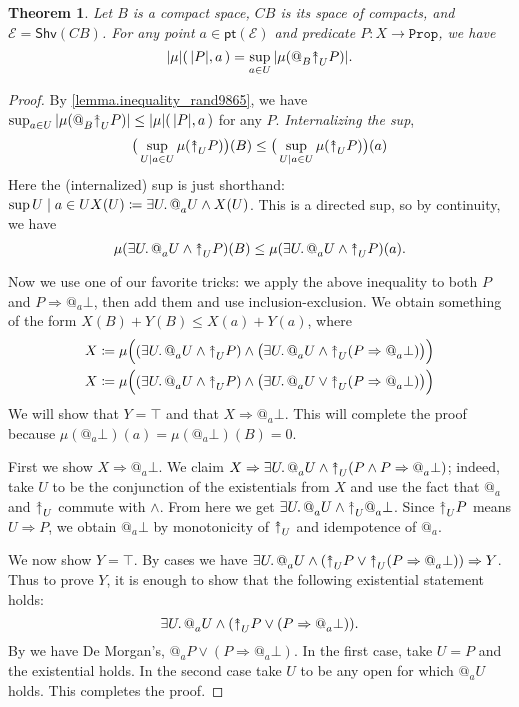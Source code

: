 \documentclass[11pt, oneside, article]{memoir}
\makeatletter
\theoremstyle{plain}
\newtheorem{theorem}{Theorem}[chapter] %
\theoremstyle{definition}
\theoremstyle{remark}
\newcommand{\const}[1]{\mathtt{#1}}
\newcommand{\cat}[1]{\mathcal{#1}}
\newcommand{\Fun}[1]{\mathsf{#1}}
\newcommand{\Shv}{\Fun{Shv}}
\newcommand{\Prop}{\const{Prop}}
\newcommand{\pt}{\Fun{pt}}
\newcommand{\AtSymbol}{{@}}
\newcommand{\InSymbol}{{\upclose}}%
\newcommand{\At}[2][]{\AtSymbol^{#1}_{#2}}
\newcommand{\In}[2][]{\InSymbol^{#1}_{#2}}
\newcommand{\upclose}{{\rotatebox[origin=c]{90}{$\twoheadrightarrow$}}}
\newcommand{\imp}{\Rightarrow}
\makeatother
\begin{document}
\begin{theorem}
Let $B$ is a compact space, $CB$ is its space of compacts, and $\cat{E}=\Shv(CB)$. For any point $a\in\pt(\cat{E})$ and predicate $P:X\to\Prop$, we have
\[
|\mu|(\,|P|,a\,)=\sup_{a\in U}|\mu(\At{B}\In{U}P)|.
\]
\end{theorem}
\begin{proof}
By \cref{lemma.inequality_rand9865}, we have $\sup_{a\in U}|\mu(\At{B}\In{U}P)|\leq |\mu|(\,|P|,a\,)$ for any $P$. \emph{Internalizing the sup}, 
\[\big(\sup_{U\mid a\in U}\mu(\In{U}P)\big)(B)\leq\big(\sup_{U\mid a\in U}\mu(\In{U}P)\big)(a)\]
Here the (internalized) sup is just shorthand: $\sup{U\mid a\in U}X(U)\coloneqq \exists U\ldotp \At{a}U\wedge X(U)$. This is a directed sup, so by continuity, we have
\[\mu(\exists U\ldotp \At{a}U\wedge\In{U}P)(B)\leq\mu(\exists U\ldotp \At{a}U\wedge\In{U}P)(a).\]

Now we use one of our favorite tricks: we apply the above inequality to both $P$ and $P\imp\At{a}\bot$, then add them and use inclusion-exclusion.
We obtain something of the form $X(B)+Y(B)\leq X(a)+Y(a)$, where
\begin{align*}
	X\coloneqq\mu\Big((\exists U\ldotp \At{a}U\wedge\In{U}P)\wedge\big(\exists U\ldotp \At{a}U\wedge\In{U}(P\imp\At{a}\bot)\big)\Big)\\
	X\coloneqq\mu\Big((\exists U\ldotp \At{a}U\wedge\In{U}P)\wedge\big(\exists U\ldotp \At{a}U\vee\In{U}(P\imp\At{a}\bot)\big)\Big)	
\end{align*}
We will show that $Y=\top$ and that $X\imp\At{a}\bot$. This will complete the proof because $\mu(\At{a}\bot)(a)=\mu(\At{a}\bot)(B)=0$.

First we show $X\imp\At{a}\bot$. We claim $X\imp\exists U\ldotp \At{a}U\wedge\In{U}(P\wedge P\imp\At{a}\bot)$; indeed, take $U$ to be the conjunction of the existentials from $X$ and use the fact that $\At{a}$ and $\In{U}$ commute with $\wedge$. From here we get $\exists U\ldotp\At{a}U\wedge\In{U}\At{a}\bot$. Since $\In{U}P$ means $U\imp P$, we obtain $\At{a}\bot$ by monotonicity of $\In{U}$ and idempotence of $\At{a}$.

We now show $Y=\top$. By cases we have $\exists U\ldotp\At{a}U\wedge(\In{U}P\vee\In{U}(P\imp\At{a}\bot))\imp Y$. Thus to prove $Y$, it is enough to show that the following existential statement holds:
\[\exists U\ldotp\At{a}U\wedge(\In{U}P\vee(P\imp\At{a}\bot)).\]
By \cite{Schultz.Spivak:2017a} we have De Morgan's, $\At{a}P\vee (P\imp\At{a}\bot)$. In the first case, take $U=P$ and the existential holds. In the second case take $U$ to be any open for which $\At{a}U$ holds. This completes the proof.
\end{proof}
\end{document}
